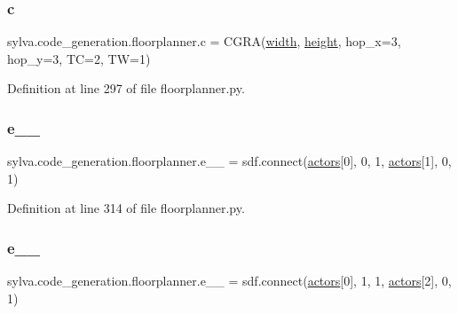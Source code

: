 \subsubsection{\texorpdfstring{c}{c}}
{\footnotesize\ttfamily sylva.\+code\+\_\+generation.\+floorplanner.\+c = C\+G\+RA(\hyperlink{namespacesylva_1_1code__generation_1_1floorplanner_a495f6aaaaf11f7af939357f74cc2b7ed}{width}, \hyperlink{namespacesylva_1_1code__generation_1_1floorplanner_a6d50951a52c9fab6840f9d1230ae0df9}{height}, hop\+\_\+x=3, hop\+\_\+y=3, TC=2, TW=1)}



Definition at line 297 of file floorplanner.\+py.

\mbox{\label{namespacesylva_1_1code__generation_1_1floorplanner_a16de3904dadb4107a0841dc48d8e5107}} 
\subsubsection{\texorpdfstring{e\+\_\+\_}{e\_0\_1}}
{\footnotesize\ttfamily sylva.\+code\+\_\+generation.\+floorplanner.\+e\+\_\+\_ = sdf.\+connect(\hyperlink{namespacesylva_1_1code__generation_1_1floorplanner_a0a7a26c9bd92be126f3b70c232ba81cd}{actors}\mbox{[}0\mbox{]}, 0, 1, \hyperlink{namespacesylva_1_1code__generation_1_1floorplanner_a0a7a26c9bd92be126f3b70c232ba81cd}{actors}\mbox{[}1\mbox{]}, 0, 1)}



Definition at line 314 of file floorplanner.\+py.

\mbox{\label{namespacesylva_1_1code__generation_1_1floorplanner_a2f30b3c5541b349790622a67f42fd8af}} 
\subsubsection{\texorpdfstring{e\+\_\+\_}{e\_0\_2}}
{\footnotesize\ttfamily sylva.\+code\+\_\+generation.\+floorplanner.\+e\+\_\+\_ = sdf.\+connect(\hyperlink{namespacesylva_1_1code__generation_1_1floorplanner_a0a7a26c9bd92be126f3b70c232ba81cd}{actors}\mbox{[}0\mbox{]}, 1, 1, \hyperlink{namespacesylva_1_1code__generation_1_1floorplanner_a0a7a26c9bd92be126f3b70c232ba81cd}{actors}\mbox{[}2\mbox{]}, 0, 1)}




